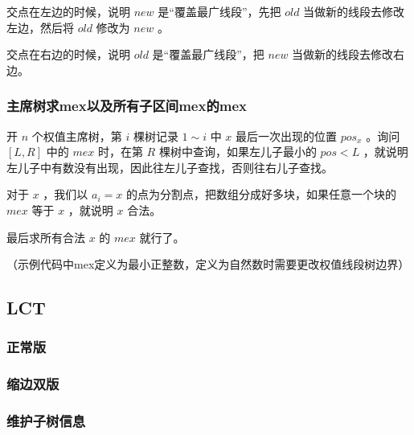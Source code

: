 交点在左边的时候，说明 $new$ 是“覆盖最广线段”，先把 $old$ 当做新的线段去修改左边，然后将 $old$ 修改为 $new$ 。

交点在右边的时候，说明 $old$ 是“覆盖最广线段”，把 $new$ 当做新的线段去修改右边。



\newpage

\subsubsection{主席树求mex以及所有子区间mex的mex}

开 $n$ 个权值主席树，第 $i$ 棵树记录 $1\sim i$ 中 $x$ 最后一次出现的位置 $pos_x$ 。询问 $[L,R]$ 中的 $mex$ 时，在第 $R$ 棵树中查询，如果左儿子最小的 $pos<L$ ，就说明左儿子中有数没有出现，因此往左儿子查找，否则往右儿子查找。

对于 $x$ ，我们以 $a_i=x$ 的点为分割点，把数组分成好多块，如果任意一个块的 $mex$ 等于 $x$ ，就说明 $x$ 合法。

最后求所有合法 $x$ 的 $mex$ 就行了。

（示例代码中mex定义为最小正整数，定义为自然数时需要更改权值线段树边界）



\newpage


\vspace{-0.1cm}

\subsection{LCT}

\subsubsection{正常版}



\vspace{-0.5cm}

\subsubsection{缩边双版}



\subsubsection{维护子树信息}

